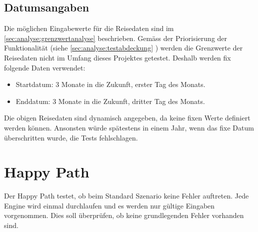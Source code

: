 \subsection{Datumsangaben}
Die möglichen Eingabewerte für die Reisedaten sind im \cref{sec:analyse:grenzwertanalyse}  beschrieben.
Gemäss der Priorisierung der Funktionalität (siehe  \cref{sec:analyse:testabdeckung} ) werden die Grenzwerte der Reisedaten nicht im Umfang dieses Projektes getestet. Deshalb werden fix folgende Daten verwendet:

\begin{itemize}
\item Startdatum: 3 Monate in die Zukunft, erster Tag des Monats.
\item Enddatum: 3 Monate in die Zukunft, dritter Tag des Monats.
\end{itemize}
\vspace{0 mm}
Die obigen Reisedaten sind dynamisch angegeben, da keine fixen Werte definiert werden können. Ansonsten würde spätestens in einem Jahr, wenn das fixe Datum überschritten wurde, die Tests fehlschlagen.

\section{Happy Path}
Der Happy Path testet, ob beim Standard Szenario keine Fehler auftreten. Jede Engine wird einmal durchlaufen und es werden nur gültige Eingaben vorgenommen. Dies soll überprüfen, ob keine grundlegenden Fehler vorhanden sind.
